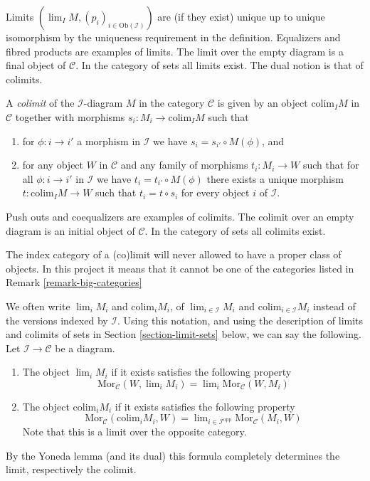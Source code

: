 \noindent
Limits $(\lim_I M, (p_i)_{i\in \text{Ob}(\mathcal{I})})$ are
(if they exist)
unique up to unique isomorphism by the uniqueness requirement
in the definition. Equalizers and fibred products are examples
of limits. The limit over the empty diagram is a final object
of $\mathcal{C}$.
In the category of sets all limits exist.
The dual notion is that of colimits.

\begin{definition}
\label{definition-colimit}
A {\it colimit} of the $\mathcal{I}$-diagram $M$ in the category
$\mathcal{C}$ is given by an object $\text{colim}_I M$ in $\mathcal{C}$
together with morphisms $s_i : M_i \to \text{colim}_I M$ such that
\begin{enumerate}
\item for $\phi : i \to i'$ a morphism
in $\mathcal{I}$ we have $s_{i} = s_{i'} \circ M(\phi)$, and
\item for any object $W$ in $\mathcal{C}$ and any family of
morphisms $t_i : M_i \to W$ such that for all $\phi : i \to i'$
in $\mathcal{I}$ we have $t_{i} = t_{i'} \circ M(\phi)$ there 
exists a unique morphism $t : \text{colim}_I M \to W$ such that
$t_i = t \circ s_i$ for every object $i$ of $\mathcal{I}$.
\end{enumerate}
\end{definition}

\noindent
Push outs and coequalizers are examples of colimits.
The colimit over an empty diagram is an initial object 
of $\mathcal{C}$. In the category of sets all colimits exist.

\begin{remark}
\label{remark-diagram-small}
The index category of a (co)limit will never allowed to have
a proper class of objects. In this project it means that
it cannot be one of the categories listed in
Remark \ref{remark-big-categories}
\end{remark}

\begin{remark}
\label{remark-limit-colim}
We often write $\lim_i M_i$ and $\text{colim}_i M_i$,
of $\lim_{i\in \mathcal{I}} M_i$ and $\text{colim}_{i\in \mathcal{I}} M_i$
instead of the versions indexed by $\mathcal{I}$.
Using this notation, and using the description of
limits and colimits of sets in Section \ref{section-limit-sets}
below, we can say the following. 
Let $\mathcal{I} \to \mathcal{C}$ be a diagram.
\begin{enumerate}
\item The object $\lim_i M_i$ if it
exists satisfies the following property
$$
\text{Mor}_{\mathcal{C}}(W, \lim\nolimits_i M_i)
=
\lim\nolimits_i \text{Mor}_{\mathcal{C}}(W, M_i)
$$
\item The object $\text{colim}_i M_i$ if it
exists satisfies the following property
$$
\text{Mor}_{\mathcal{C}}(\text{colim}_i M_i, W)
=
\lim\nolimits_{i\in \mathcal{I}^\text{opp}} \text{Mor}_{\mathcal{C}}(M_i, W)
$$
Note that this is a limit over the opposite category.
\end{enumerate}
By the Yoneda lemma (and its dual) this formula completely determines the
limit, respectively the colimit.
\end{remark}

